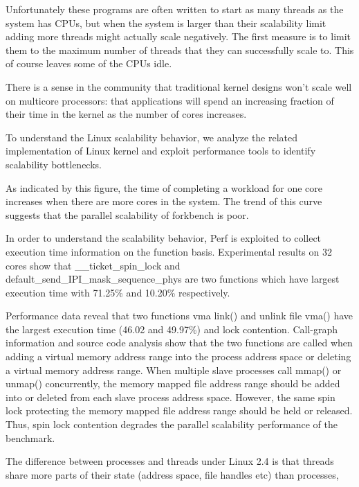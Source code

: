 Unfortunately these programs are often written to start as many threads as the system has CPUs, 
but when the system is larger than their scalability limit adding more threads might actually scale negatively.
The first measure is to limit them to the maximum number of threads that they can successfully scale to.
This of course leaves some of the CPUs idle. 




There is a sense in the community that traditional kernel
designs won’t scale well on multicore processors: that
applications will spend an increasing fraction of their time
in the kernel as the number of cores increases.

To understand the Linux scalability
behavior, we analyze the related implementation of Linux
kernel and exploit performance tools to identify scalability
bottlenecks.


As indicated by this figure, the time of completing
a workload for one core increases when there are more
cores in the system. The trend of this curve suggests that
the parallel scalability of forkbench is poor.

In order to understand the scalability behavior, 
Perf\cite{} is exploited to collect execution time information
on the function basis. 
Experimental results on 32 cores
show that \_\_ticket\_spin\_lock and 
default\_send\_IPI\_mask\_sequence\_phys are two functions 
which have largest execution time with 71.25\% and 10.20\% respectively. 

Performance data reveal that two functions vma link() and
unlink file vma() have the largest execution time (46.02%
and 49.97\%) and lock contention. Call-graph information
and source code analysis show that the two functions are
called when adding a virtual memory address range into the
process address space or deleting a virtual memory address range. 
When multiple slave processes call mmap() or unmap() concurrently, the 
memory mapped file address range should be added into or 
deleted from each slave process address space. However, 
the same spin lock protecting the memory mapped file 
address range should be held or released. Thus, spin lock 
contention degrades the parallel scalability performance of 
the benchmark. 



The difference between processes and threads under Linux 2.4 is that threads share more parts of their state (address space, file handles etc) than processes, 
